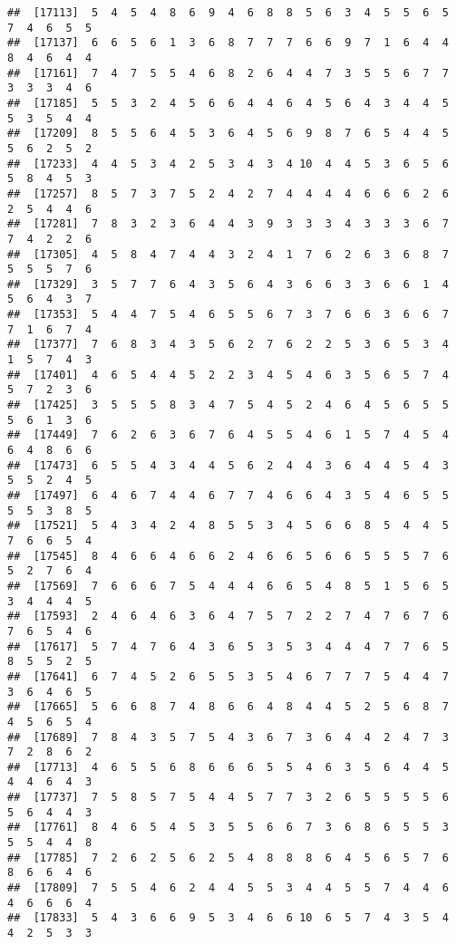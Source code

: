 \documentclass[
]{book}
\begin{document}
\begin{verbatim}
##  [17113]  5  4  5  4  8  6  9  4  6  8  8  5  6  3  4  5  5  6  5  7  4  6  5  5
##  [17137]  6  6  5  6  1  3  6  8  7  7  7  6  6  9  7  1  6  4  4  8  4  6  4  4
##  [17161]  7  4  7  5  5  4  6  8  2  6  4  4  7  3  5  5  6  7  7  3  3  3  4  6
##  [17185]  5  5  3  2  4  5  6  6  4  4  6  4  5  6  4  3  4  4  5  5  3  5  4  4
##  [17209]  8  5  5  6  4  5  3  6  4  5  6  9  8  7  6  5  4  4  5  5  6  2  5  2
##  [17233]  4  4  5  3  4  2  5  3  4  3  4 10  4  4  5  3  6  5  6  5  8  4  5  3
##  [17257]  8  5  7  3  7  5  2  4  2  7  4  4  4  4  6  6  6  2  6  2  5  4  4  6
##  [17281]  7  8  3  2  3  6  4  4  3  9  3  3  3  4  3  3  3  6  7  7  4  2  2  6
##  [17305]  4  5  8  4  7  4  4  3  2  4  1  7  6  2  6  3  6  8  7  5  5  5  7  6
##  [17329]  3  5  7  7  6  4  3  5  6  4  3  6  6  3  3  6  6  1  4  5  6  4  3  7
##  [17353]  5  4  4  7  5  4  6  5  5  6  7  3  7  6  6  3  6  6  7  7  1  6  7  4
##  [17377]  7  6  8  3  4  3  5  6  2  7  6  2  2  5  3  6  5  3  4  1  5  7  4  3
##  [17401]  4  6  5  4  4  5  2  2  3  4  5  4  6  3  5  6  5  7  4  5  7  2  3  6
##  [17425]  3  5  5  5  8  3  4  7  5  4  5  2  4  6  4  5  6  5  5  5  6  1  3  6
##  [17449]  7  6  2  6  3  6  7  6  4  5  5  4  6  1  5  7  4  5  4  6  4  8  6  6
##  [17473]  6  5  5  4  3  4  4  5  6  2  4  4  3  6  4  4  5  4  3  5  5  2  4  5
##  [17497]  6  4  6  7  4  4  6  7  7  4  6  6  4  3  5  4  6  5  5  5  5  3  8  5
##  [17521]  5  4  3  4  2  4  8  5  5  3  4  5  6  6  8  5  4  4  5  7  6  6  5  4
##  [17545]  8  4  6  6  4  6  6  2  4  6  6  5  6  6  5  5  5  7  6  5  2  7  6  4
##  [17569]  7  6  6  6  7  5  4  4  4  6  6  5  4  8  5  1  5  6  5  3  4  4  4  5
##  [17593]  2  4  6  4  6  3  6  4  7  5  7  2  2  7  4  7  6  7  6  7  6  5  4  6
##  [17617]  5  7  4  7  6  4  3  6  5  3  5  3  4  4  4  7  7  6  5  8  5  5  2  5
##  [17641]  6  7  4  5  2  6  5  5  3  5  4  6  7  7  7  5  4  4  7  3  6  4  6  5
##  [17665]  5  6  6  8  7  4  8  6  6  4  8  4  4  5  2  5  6  8  7  4  5  6  5  4
##  [17689]  7  8  4  3  5  7  5  4  3  6  7  3  6  4  4  2  4  7  3  7  2  8  6  2
##  [17713]  4  6  5  5  6  8  6  6  6  5  5  4  6  3  5  6  4  4  5  4  4  6  4  3
##  [17737]  7  5  8  5  7  5  4  4  5  7  7  3  2  6  5  5  5  5  6  5  6  4  4  3
##  [17761]  8  4  6  5  4  5  3  5  5  6  6  7  3  6  8  6  5  5  3  5  5  4  4  8
##  [17785]  7  2  6  2  5  6  2  5  4  8  8  8  6  4  5  6  5  7  6  8  6  6  4  6
##  [17809]  7  5  5  4  6  2  4  4  5  5  3  4  4  5  5  7  4  4  6  4  6  6  6  4
##  [17833]  5  4  3  6  6  9  5  3  4  6  6 10  6  5  7  4  3  5  4  4  2  5  3  3

\end{verbatim}
\end{document}
